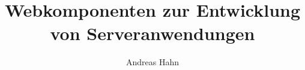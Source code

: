 \documentclass[bachelor,german]{hgbthesis}
\title{Webkomponenten zur Entwicklung von Serveranwendungen }
\author{Andreas Hahn}
\begin{document}

\frontmatter                    %

\maketitle
\tableofcontents

		
			

\mainmatter          %











\MakeBibliography                        %


\end{document}
